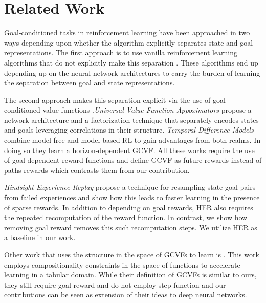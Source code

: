\section{Related Work}

Goal-conditioned tasks in reinforcement learning have been approached in two
ways depending upon whether the algorithm explicitly separates state and goal
representations.
The first approach is to use vanilla reinforcement
learning algorithms that do not explicitly make this separation
\citep{mirowski2016learning,dosovitskiy2016learning,gupta2017cognitive,parisotto2017neural,mirowski2018learning}.
These algorithms end up depending up on the neural network architectures to
carry the burden of learning the separation between goal and state representations.

The second approach makes this separation explicit via the use of goal-conditioned value
functions \citep{foster2002structure,sutton2011horde}.\emph{Universal
Value Function Appoximators} \citep{schaul2015universal} propose a
network architecture and a factorization technique that separately
encodes states and goals leveraging correlations in their structure.
\emph{Temporal Difference Models} combine model-free
and model-based RL to gain advantages from both realms. In doing so they
learn a horizon-dependent GCVF. All these works require the use of
goal-dependent reward functions and define GCVF as future-rewards instead of
paths rewards which contrasts them from our contribution. 

\emph{Hindsight Experience Replay} \citep{andrychowicz2017hindsight}
propose a technique for resampling state-goal pairs from failed
experiences and show how this leads to faster learning in the presence
of sparse rewards. In addition to depending on goal rewards, HER also
requires the repeated recomputation of the reward function. In contrast,
we show how removing goal reward removes this such recomputation steps.
We utilize HER as a baseline in our work. 

Other work that uses the structure in the space of GCVFs to learn is
\citet{dhiman2018floydwarshall}. This work employs compositionality constraints
in the space of functions to accelerate learning in a tabular domain. While
their definition of GCVFs is similar to ours, they still require goal-reward and
do not employ step function and our contributions can be seen as extension of
their ideas to deep neural networks.


